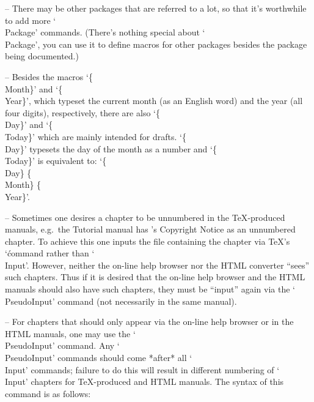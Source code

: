 \item{--}
There may be other packages that are referred to  a  lot,  so  that  it's
worthwhile to add more `\\Package'  commands.  (There's  nothing  special
about `\\Package', you can use it to define  macros  for  other  packages
besides the package being documented.)

\item{--}
Besides the macros `\{\\Month\}'  and  `\{\\Year\}',  which  typeset  the
current month (as an English  word)  and  the  year  (all  four  digits),
respectively, there are also  `\{\\Day\}'  and  `\{\\Today\}'  which  are
mainly intended for drafts. `\{\\Day\}' typesets the day of the month  as
a number and  `\{\\Today\}'  is  equivalent  to:  `\{\\Day\}  \{\\Month\}
\{\\Year\}'.

\item{--}
Sometimes one desires a chapter to be unnumbered in  the  {\TeX}-produced
manuals, e.g.~the Tutorial manual has {\GAP}'s  Copyright  Notice  as  an
unnumbered chapter. To achieve this one inputs the  file  containing  the
chapter via {\TeX}'s `\' command rather  than  `\\Input'.  However,
neither the on-line help browser nor the  HTML  converter  ``sees''  such
chapters. Thus if it is desired that the on-line  help  browser  and  the
HTML manuals should also have such chapters, they must be ``input'' again
via the `\\PseudoInput' command (not necessarily in the same manual).

\item{--}
For chapters that should only appear via the on-line help browser  or  in
the  HTML  manuals,  one  may  use  the  `\\PseudoInput'   command.   Any
`\\PseudoInput'  commands should come  *after*  all  `\\Input'  commands;
failure to do this  will  result  in  different  numbering  of  `\\Input'
chapters for {\TeX}-produced and HTML manuals. The syntax of this command
is as follows:

